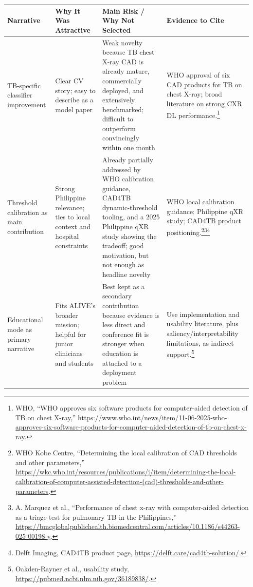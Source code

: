 \documentclass[11pt]{article}
\begin{document}
\begin{longtable}{p{} p{} p{} p{}}
\toprule
\textbf{Narrative} & \textbf{Why It Was Attractive} & \textbf{Main Risk / Why Not Selected} & \textbf{Evidence to Cite} \\
\midrule
TB-specific classifier improvement & Clear CV story; easy to describe as a model paper & Weak novelty because TB chest X-ray CAD is already mature, commercially deployed, and extensively benchmarked; difficult to outperform convincingly within one month & WHO approval of six CAD products for TB on chest X-ray; broad literature on strong CXR DL performance.\footnote{WHO, ``WHO approves six software products for computer-aided detection of TB on chest X-ray,'' \url{https://www.who.int/news/item/11-06-2025-who-approves-six-software-products-for-computer-aided-detection-of-tb-on-chest-x-ray}.} \\

Threshold calibration as main contribution & Strong Philippine relevance; ties to local context and hospital constraints & Already partially addressed by WHO calibration guidance, CAD4TB dynamic-threshold tooling, and a 2025 Philippine qXR study showing the tradeoff; good motivation, but not enough as headline novelty & WHO local calibration guidance; Philippine qXR study; CAD4TB product positioning.\footnote{WHO Kobe Centre, ``Determining the local calibration of CAD thresholds and other parameters,'' \url{https://wkc.who.int/resources/publications/i/item/determining-the-local-calibration-of-computer-assisted-detection-(cad)-thresholds-and-other-parameters}.}\footnote{A. Marquez et al., ``Performance of chest x-ray with computer-aided detection as a triage test for pulmonary TB in the Philippines,'' \url{https://bmcglobalpublichealth.biomedcentral.com/articles/10.1186/s44263-025-00198-y}.}\footnote{Delft Imaging, CAD4TB product page, \url{https://delft.care/cad4tb-solution/}.} \\

Educational mode as primary narrative & Fits ALIVE's broader mission; helpful for junior clinicians and students & Best kept as a secondary contribution because evidence is less direct and conference fit is stronger when education is attached to a deployment problem & Use implementation and usability literature, plus saliency/interpretability limitations, as indirect support.\footnote{Oakden-Rayner et al., usability study, \url{https://pubmed.ncbi.nlm.nih.gov/36189838/}.} \\


\end{longtable}
\end{document}

